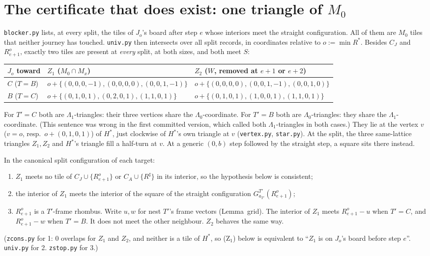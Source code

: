 \documentclass[11pt]{article}
\theoremstyle{definition}\newtheorem{definition}[theorem]{Definition}\newtheorem{remark}[theorem]{Remark}
\begin{document}
\section{The certificate that does exist: one triangle of $M_0$}\label{sec:Z}
\texttt{blocker.py} lists, at every split, the tiles of $J_o$'s board after step $e$ whose interiors meet the straight configuration. All of them are $M_0$ tiles that neither journey has touched. \texttt{univ.py} then intersects over all split records, in coordinates relative to $o:=\min R^\ast$. Besides $C_J$ and $R^o_{e+1}$, exactly two tiles are present at \emph{every} split, at both sizes, and both meet $S$:
\begin{center}\small\begin{tabular}{lll}\toprule
$J_o$ toward & $Z_1$ ($M_0\cap M_x$) & $Z_2$ ($W$, removed at $e+1$ or $e+2$)\\\midrule
$C$ ($T=B$) & $o+\{(0,0,0,-1),(0,0,0,0),(0,0,1,-1)\}$ & $o+\{(0,0,0,0),(0,0,1,-1),(0,0,1,0)\}$\\
$B$ ($T=C$) & $o+\{(0,1,0,1),(0,2,0,1),(1,1,0,1)\}$ & $o+\{(0,1,0,1),(1,0,0,1),(1,1,0,1)\}$\\\bottomrule
\end{tabular}\end{center}
For $T'=C$ both are $\Lambda_1$-triangles: their three vertices share the $\Lambda_0$-coordinate. For $T'=B$ both are $\Lambda_0$-triangles: they share the $\Lambda_1$-coordinate. (This sentence was wrong in the first committed version, which called both $\Lambda_1$-triangles in both cases.) They lie at the vertex $v$ ($v=o$, resp.\ $o+(0,1,0,1)$) of $H^\ast$, just clockwise of $H^\ast$'s own triangle at $v$ (\texttt{vertex.py}, \texttt{star.py}). At the split, the three same-lattice triangles $Z_1,Z_2$ and $H^\ast$'s triangle fill a half-turn at $v$. At a generic $(0,b)$ step followed by the straight step, a square sits there instead.

\begin{lemma}\label{lem:Zblock}
In the canonical split configuration of each target:
\begin{enumerate}
\item $Z_1$ meets no tile of $C_J\cup\{R^o_{e+1}\}$ or $C_A\cup\{R^\sharp\}$ in its interior, so the hypothesis below is consistent;
\item the interior of $Z_1$ meets the interior of the square of the straight configuration $G^{T'}_{a_{T'}}(R^o_{e+1})$;
\item $R^o_{e+1}$ is a $T'$-frame rhombus. Write $u,w$ for nest $T'$'s frame vectors (Lemma~grid). The interior of $Z_1$ meets $R^o_{e+1}-u$ when $T'=C$, and $R^o_{e+1}-w$ when $T'=B$. It does not meet the other neighbour. $Z_2$ behaves the same way.
\end{enumerate}
\end{lemma}
\noindent (\texttt{zcons.py} for 1: 0 overlaps for $Z_1$ and $Z_2$, and neither is a tile of $H^\ast$, so (Z$_1$) below is equivalent to ``$Z_1$ is on $J_o$'s board before step $e$''. \texttt{univ.py} for 2. \texttt{zstop.py} for 3.)
\end{document}
